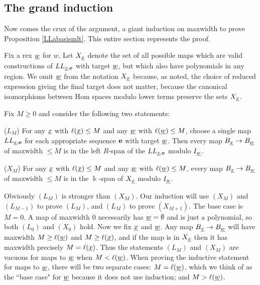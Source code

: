 \subsection{The grand induction}
\label{subsec-hereitis}

Now comes the crux of the argument, a giant induction on maxwidth to prove Proposition \ref{LLabasismlt}. This entire section represents the proof.

Fix a rex ${\underline{w}}$ for $w$. Let $X_{{\underline{x}}}$ denote the set of all possible maps which are valid constructions of $LL_{{\underline{x}},{\mathbf e}}$ with target ${\underline{w}}$, but which also have polynomials in any
region. We omit ${\underline{w}}$ from the notation $X_{\underline{x}}$ because, as noted, the choice of reduced expression giving the final target does not matter, because the canonical isomorphisms between Hom spaces modulo lower terms
preserve the sets $X_{\underline{x}}$.

Fix $M \ge 0$ and consider the following two statements:

\vspace{0.5cm}

($L_M$) For any ${\underline{x}}$ with $\ell({\underline{x}}) \le M$ and any ${\underline{w}}$ with $\ell({\underline{w}}) \le M$, choose a single map $LL_{{\underline{x}},{\mathbf e}}$ for each appropriate sequence ${\mathbf e}$ with target ${\underline{w}}$. Then every map
$B_{\underline{x}} \rightarrow B_{\underline{w}}$ of maxwidth $\le M$ is in the left $R$-span of the $LL_{{\underline{x}},{\mathbf e}}$ modulo $I_{\underline{w}}$.

\vspace{0.5cm}

($X_M$) For any ${\underline{x}}$ with $\ell({\underline{x}}) \le M$ and any ${\underline{w}}$ with $\ell({\underline{w}}) \le M$, every map $B_{\underline{x}} \rightarrow B_{\underline{w}}$ of maxwidth $\le M$ is in the $\Bbbk$-span of $X_{\underline{x}}$ modulo $I_{\underline{w}}$.

\vspace{0.5cm}

Obviously $(L_M)$ is stronger than $(X_M)$. Our induction will use $(X_M)$ and $(L_{M-1})$ to prove $(L_M)$, and $(L_M)$ to prove $(X_{M+1})$. The base case is $M=0$. A map of maxwidth $0$ necessarily has $\underline{w} = \emptyset$ and is just a polynomial, so both $(L_0)$ and $(X_0)$ hold. Now we fix ${\underline{x}}$ and ${\underline{w}}$. Any map $B_{\underline{x}} \rightarrow B_{\underline{w}}$ will have maxwidth $M \ge \ell({\underline{w}})$ and $M \ge \ell({\underline{x}})$, and if the map is in
$X_{\underline{x}}$ then it has maxwidth precisely $M=\ell({\underline{x}})$. Thus the statements $(L_M)$ and $(X_M)$ are vacuous for maps to ${\underline{w}}$ when $M < \ell({\underline{w}})$. When proving the inductive statement for maps to
${\underline{w}}$, there will be two separate cases: $M=\ell({\underline{w}})$, which we think of as the ``base case" for ${\underline{w}}$ because it does not use induction; and $M>\ell({\underline{w}})$.

